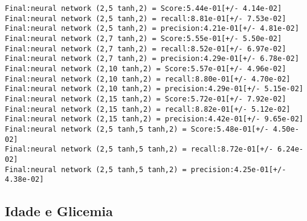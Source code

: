 \documentclass[11pt]{article}
\begin{document}
    \begin{Verbatim}[commandchars=\\\{\}]
Final:neural network (2,5 tanh,2) = Score:5.44e-01[+/- 4.14e-02]
Final:neural network (2,5 tanh,2) = recall:8.81e-01[+/- 7.53e-02]
Final:neural network (2,5 tanh,2) = precision:4.21e-01[+/- 4.81e-02]
Final:neural network (2,7 tanh,2) = Score:5.55e-01[+/- 5.50e-02]
Final:neural network (2,7 tanh,2) = recall:8.52e-01[+/- 6.97e-02]
Final:neural network (2,7 tanh,2) = precision:4.29e-01[+/- 6.78e-02]
Final:neural network (2,10 tanh,2) = Score:5.57e-01[+/- 4.96e-02]
Final:neural network (2,10 tanh,2) = recall:8.80e-01[+/- 4.70e-02]
Final:neural network (2,10 tanh,2) = precision:4.29e-01[+/- 5.15e-02]
Final:neural network (2,15 tanh,2) = Score:5.72e-01[+/- 7.92e-02]
Final:neural network (2,15 tanh,2) = recall:8.82e-01[+/- 5.12e-02]
Final:neural network (2,15 tanh,2) = precision:4.42e-01[+/- 9.65e-02]
Final:neural network (2,5 tanh,5 tanh,2) = Score:5.48e-01[+/- 4.50e-02]
Final:neural network (2,5 tanh,5 tanh,2) = recall:8.72e-01[+/- 6.24e-02]
Final:neural network (2,5 tanh,5 tanh,2) = precision:4.25e-01[+/- 4.38e-02]

    \end{Verbatim}

    \subsection{Idade e Glicemia}\label{idade-e-glicemia}
\end{document}
